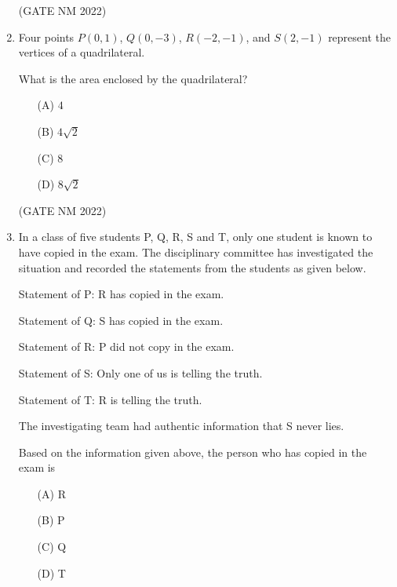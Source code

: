 \documentclass[journal,12pt,onecolumn]{IEEEtran}
\theoremstyle{remark}
\begin{document}
\begin{enumerate}
\begin{multicols}{2}
\end{multicols}

\hfill(GATE NM 2022)



\item  Four points $P(0, 1)$, $Q(0, -3)$, $R(-2, -1)$, and $S(2, -1)$ represent the vertices of a quadrilateral.  

What is the area enclosed by the quadrilateral? 

\begin{multicols}{4}

\begin{enumerate}
    \item[(A)] $4$
    \item[(B)] $4\sqrt{2}$
    \item[(C)] $8$
    \item[(D)] $8\sqrt{2}$
\end{enumerate}

\end{multicols}

\hfill(GATE NM 2022)






\item  In a class of five students P, Q, R, S and T, only one student is known to have copied in the exam. The disciplinary committee has investigated the situation and recorded the statements from the students as given below.  

{Statement of P:} R has copied in the exam.  

{Statement of Q:} S has copied in the exam.  

{Statement of R:} P did not copy in the exam.  

{Statement of S:} Only one of us is telling the truth.  

{Statement of T:} R is telling the truth.  

The investigating team had authentic information that S never lies.  

Based on the information given above, the person who has copied in the exam is  

\begin{multicols}{4}

\begin{enumerate}
    \item[(A)] R
    \item[(B)] P
    \item[(C)] Q
    \item[(D)] T
\end{enumerate}


\end{multicols}
\end{enumerate}
\end{document}
